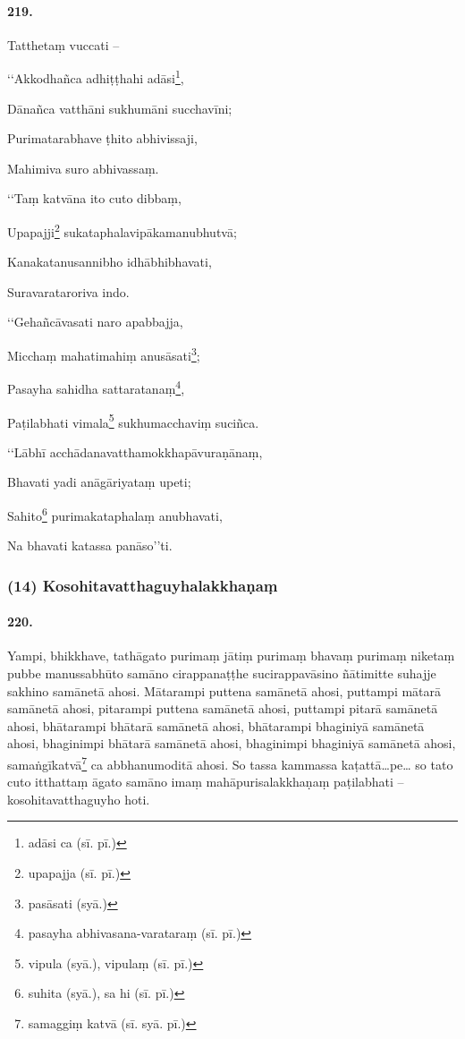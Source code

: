 \paragraph{219.} Tatthetaṃ vuccati –

‘‘Akkodhañca adhiṭṭhahi adāsi\footnote{adāsi ca (sī. pī.)},

Dānañca vatthāni sukhumāni succhavīni;

Purimatarabhave ṭhito abhivissaji,

Mahimiva suro abhivassaṃ.

‘‘Taṃ katvāna ito cuto dibbaṃ,

Upapajji\footnote{upapajja (sī. pī.)} sukataphalavipākamanubhutvā;

Kanakatanusannibho idhābhibhavati,

Suravarataroriva indo.

‘‘Gehañcāvasati naro apabbajja,

Micchaṃ mahatimahiṃ anusāsati\footnote{pasāsati (syā.)};

Pasayha sahidha sattaratanaṃ\footnote{pasayha abhivasana-varataraṃ (sī. pī.)},

Paṭilabhati vimala\footnote{vipula (syā.), vipulaṃ (sī. pī.)} sukhumacchaviṃ suciñca.

‘‘Lābhī acchādanavatthamokkhapāvuraṇānaṃ,

Bhavati yadi anāgāriyataṃ upeti;

Sahito\footnote{suhita (syā.), sa hi (sī. pī.)} purimakataphalaṃ anubhavati,

Na bhavati katassa panāso’’ti.

\subsubsection{(14) Kosohitavatthaguyhalakkhaṇaṃ}

\paragraph{220.} Yampi, bhikkhave, tathāgato purimaṃ jātiṃ purimaṃ bhavaṃ purimaṃ niketaṃ pubbe manussabhūto samāno cirappanaṭṭhe sucirappavāsino ñātimitte suhajje sakhino samānetā ahosi. Mātarampi puttena samānetā ahosi, puttampi mātarā samānetā ahosi, pitarampi puttena samānetā ahosi, puttampi pitarā samānetā ahosi, bhātarampi bhātarā samānetā ahosi, bhātarampi bhaginiyā samānetā ahosi, bhaginimpi bhātarā samānetā ahosi, bhaginimpi bhaginiyā samānetā ahosi, samaṅgīkatvā\footnote{samaggiṃ katvā (sī. syā. pī.)} ca abbhanumoditā ahosi. So tassa kammassa kaṭattā…pe… so tato cuto itthattaṃ āgato samāno imaṃ mahāpurisalakkhaṇaṃ paṭilabhati – kosohitavatthaguyho hoti.

